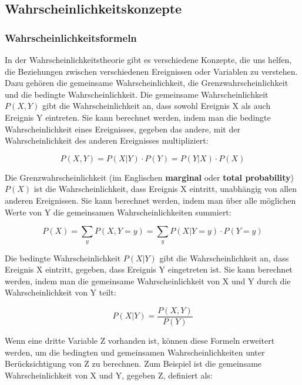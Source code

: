 \documentclass[letterpaper, titlepage]{article}
\begin{document}
\vspace{0.35cm}

\subsection{Wahrscheinlichkeitskonzepte}\label{Wahrscheinlichkeitskonzepte}

\subsubsection{Wahrscheinlichkeitsformeln}\label{Wahrscheinlichkeitsformeln}

In der Wahrscheinlichkeitstheorie gibt es verschiedene Konzepte, die uns helfen, die Beziehungen zwischen verschiedenen Ereignissen oder Variablen zu verstehen. Dazu gehören die gemeinsame Wahrscheinlichkeit, die Grenzwahrscheinlichkeit und die bedingte Wahrscheinlichkeit. Die gemeinsame Wahrscheinlichkeit $P(X, Y)$ gibt die Wahrscheinlichkeit an, dass sowohl Ereignis X als auch Ereignis Y eintreten. Sie kann berechnet werden, indem man die bedingte Wahrscheinlichkeit eines Ereignisses, gegeben das andere, mit der Wahrscheinlichkeit des anderen Ereignisses multipliziert:

\begin{equation} P(X, Y) = P(X|Y) \cdot P(Y) = P(Y|X) \cdot P(X) \end{equation}

Die Grenzwahrscheinlichkeit (im Englischen \textbf{marginal} oder \textbf{total probability}) $P(X)$ ist die Wahrscheinlichkeit, dass Ereignis X eintritt, unabhängig von allen anderen Ereignissen. Sie kann berechnet werden, indem man über alle möglichen Werte von Y die gemeinsamen Wahrscheinlichkeiten summiert:

\begin{equation} P(X) = \sum_{y} P(X, Y=y) = \sum_{y} P(X|Y=y) \cdot P(Y=y) \end{equation}

Die bedingte Wahrscheinlichkeit $P(X|Y)$ gibt die Wahrscheinlichkeit an, dass Ereignis X eintritt, gegeben, dass Ereignis Y eingetreten ist. Sie kann berechnet werden, indem man die gemeinsame Wahrscheinlichkeit von X und Y durch die Wahrscheinlichkeit von Y teilt:

\begin{equation} P(X|Y) = \frac{P(X, Y)}{P(Y)} \end{equation}

Wenn eine dritte Variable Z vorhanden ist, können diese Formeln erweitert werden, um die bedingten und gemeinsamen Wahrscheinlichkeiten unter Berücksichtigung von Z zu berechnen. Zum Beispiel ist die gemeinsame Wahrscheinlichkeit von X und Y, gegeben Z, definiert als:
\end{document}
